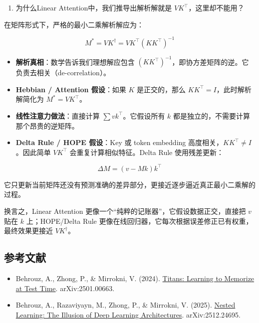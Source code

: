 \begin{enumerate}
\def\labelenumi{\arabic{enumi}.}
\setcounter{enumi}{1}
\tightlist
\item
  为什么Linear Attention中，我们推导出解析解就是 \(VK^\top\)，这里却不能用？
\end{enumerate}

在矩阵形式下，严格的最小二乘解析解应为：

\[
M^* = VK^\dagger
=
VK^\top(KK^\top)^{-1}
\]

\begin{itemize}
\tightlist
\item
  \textbf{解析真相}：数学告诉我们理想解应包含 \((KK^\top)^{-1}\)，即协方差矩阵的逆。它负责去相关（de-correlation）。
\item
  \textbf{Hebbian / Attention 假设}：如果 \(K\) 是正交的，那么 \(KK^\top=I\)，此时解析解简化为 \(M^*=VK^\top\)。
\item
  \textbf{线性注意力做法}：直接计算 \(\sum vk^\top\)。它假设所有 \(k\) 都是独立的，不需要计算那个昂贵的逆矩阵。
\item
  \textbf{Delta Rule / HOPE 假设}：Key 或 token embedding 高度相关，\(KK^\top\neq I\)。因此简单 \(VK^\top\) 会重复计算相似特征。Delta Rule 使用残差更新：
\end{itemize}

\[
\Delta M = (v-Mk)k^\top
\]

它只更新当前矩阵还没有预测准确的差异部分，更接近逐步逼近真正最小二乘解的过程。

换言之，Linear Attention 更像一个``纯粹的记账器''，它假设数据正交，直接把 \(v\) 贴在 \(k\) 上；HOPE/Delta Rule 更像在线回归器，它每次根据误差修正已有权重，最终效果更接近 \(VK^\dagger\)。

\hypertarget{ux53c2ux8003ux6587ux732e-149}{%
\subsection{参考文献}\label{ux53c2ux8003ux6587ux732e-149}}

\begin{itemize}
\tightlist
\item
  Behrouz, A., Zhong, P., \& Mirrokni, V. (2024). \href{https://arxiv.org/abs/2501.00663}{Titans: Learning to Memorize at Test Time}. arXiv:2501.00663.
\item
  Behrouz, A., Razaviyayn, M., Zhong, P., \& Mirrokni, V. (2025). \href{https://arxiv.org/abs/2512.24695}{Nested Learning: The Illusion of Deep Learning Architectures}. arXiv:2512.24695.
\end{itemize}

